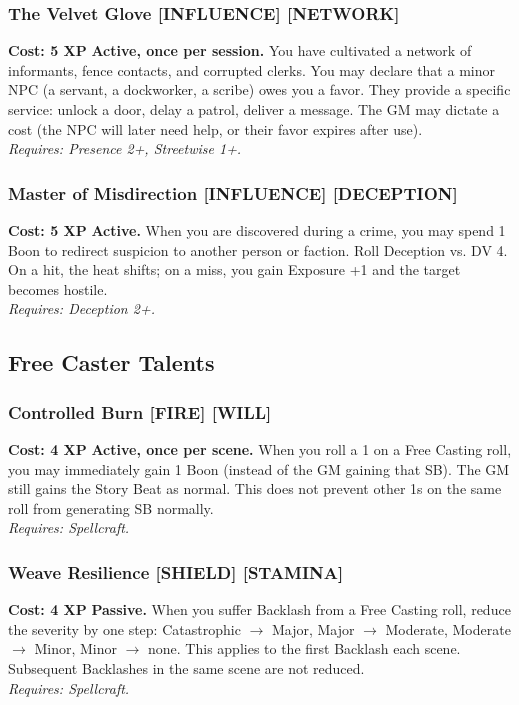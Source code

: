 \documentclass[12pt,a4paper]{book}
\begin{document}
\subsubsection*{The Velvet Glove \textnormal{[INFLUENCE] [NETWORK]}}
\label{talent:velvet-glove}
\textbf{Cost: 5 XP} \textbf{Active, once per session.} You have cultivated a network of informants, fence contacts, and corrupted clerks. You may declare that a minor NPC (a servant, a dockworker, a scribe) owes you a favor. They provide a specific service: unlock a door, delay a patrol, deliver a message. The GM may dictate a cost (the NPC will later need help, or their favor expires after use). \\
\textit{Requires: Presence 2+, Streetwise 1+.}

\subsubsection*{Master of Misdirection \textnormal{[INFLUENCE] [DECEPTION]}}
\label{talent:master-of-misdirection}
\textbf{Cost: 5 XP} \textbf{Active.} When you are discovered during a crime, you may spend 1 Boon to redirect suspicion to another person or faction. Roll Deception vs. DV 4. On a hit, the heat shifts; on a miss, you gain Exposure +1 and the target becomes hostile. \\
\textit{Requires: Deception 2+.}

\subsection*{Free Caster Talents}
\label{sec:major-freecaster}

\subsubsection*{Controlled Burn \textnormal{[FIRE] [WILL]}}
\label{talent:controlled-burn}
\textbf{Cost: 4 XP} \textbf{Active, once per scene.} When you roll a 1 on a Free Casting roll, you may immediately gain 1 Boon (instead of the GM gaining that SB). The GM still gains the Story Beat as normal. This does not prevent other 1s on the same roll from generating SB normally. \\
\textit{Requires: Spellcraft.}

\subsubsection*{Weave Resilience \textnormal{[SHIELD] [STAMINA]}}
\label{talent:weave-resilience}
\textbf{Cost: 4 XP} \textbf{Passive.} When you suffer Backlash from a Free Casting roll, reduce the severity by one step: Catastrophic $\rightarrow$ Major, Major $\rightarrow$ Moderate, Moderate $\rightarrow$ Minor, Minor $\rightarrow$ none. This applies to the first Backlash each scene. Subsequent Backlashes in the same scene are not reduced. \\
\textit{Requires: Spellcraft.}
\end{document}
